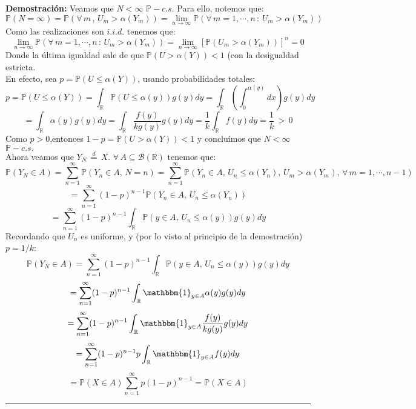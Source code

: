 \documentclass[a4paper]{article}
\numberwithin{equation}{subsection}
\numberwithin{definicion}{subsection}
\def\R{\mathbb R}
\def\to{\rightarrow}
\newcommand{\pb}{\mathbb{P}}
\begin{document}
\textbf{Demostración: }Veamos que $N<\infty$ $\pb-c.s.$ Para ello, notemos que:
\[\pb(N=\infty) = \pb(\forall\,m\,,\,U_m>\alpha(Y_m)) = \lim_{n \to \infty}\pb(\forall\,m=1,\cdots,n\,:\,U_m>\alpha(Y_m))\]
Como las realizaciones son $i.i.d.$ tenemos que:
\[\lim_{n \to \infty}\pb(\forall\,m=1,\cdots,n\,:\,U_m>\alpha(Y_m)) = \lim_{n \to \infty}\left[\pb(U_m > \alpha(Y_m))\right]^{n} = 0\]
Donde la última igualdad sale de que $\pb(U>\alpha(Y)) < 1$ (con la desigualdad estricta.\\ \newline
En efecto, sea $p=\pb(U\leq \alpha(Y))$, usando probabilidades totales:
\[p = \pb(U\leq \alpha(Y)) = \int_{\R}\pb(U\leq \alpha(y))g(y)dy= \int_{\R}\left(\int_{0}^{\alpha(y)}dx\right)g(y)dy\]
\[=\int_{\R}\alpha(y)g(y)dy = \int_{\R}\frac{f(y)}{kg(y)}g(y)dy = \frac{1}{k}\int_{\R}f(y)dy = \frac{1}{k}\,>\,0\]
Como $p>0$,entonces $1-p = \pb(U>\alpha(Y))<1$ y concluímos que $N<\infty$ $\pb-c.s.$\\ \newline
Ahora veamos que $Y_N \,\overset{d}{=}\,X$. $\forall\,A\subseteq \mathcal{B}(\R)$ tenemos que:
\[\pb(Y_N \in A) = \sum_{n=1}^{\infty}\pb(Y_n \in A,\,N=n) = \sum_{n=1}^{\infty}\pb(Y_n \in A,\,U_n\leq\alpha(Y_n),\,U_m>\alpha(Y_m),\,\forall\,m=1,\cdots,n-1)\]
\[=\sum_{n=1}^{\infty}(1-p)^{n-1}\pb(Y_n \in A,\,U_n\leq \alpha(Y_n))\]\[= \sum_{n=1}^{\infty}(1-p)^{n-1} \int_{\R}\pb(y \in A,\,U_n\leq \alpha(y))g(y)dy\]
Recordando que $U_n$ es uniforme, y (por lo visto al principio de la demostración) $p=1/k$:
\[\pb(Y_N \in A)= \sum_{n=1}^{\infty}(1-p)^{n-1} \int_{\R}\pb(y \in A,\,U_n\leq \alpha(y))g(y)dy\]\[= \sum_{n=1}^{\infty}(1-p)^{n-1}\int_{\R}\mathbbm{1}_{y\in A}\alpha(y)g(y) dy\]
\[=\sum_{n=1}^{\infty}(1-p)^{n-1}\int_{\R}\mathbbm{1}_{y\in A}\frac{f(y)}{kg(y)}g(y) dy\] \[= \sum_{n=1}^{\infty}(1-p)^{n-1}p\int_{\R}\mathbbm{1}_{y\in A}f(y) dy\] \[= \pb(X \in A)\sum_{n=1}^{\infty}p(1-p)^{n-1}= \pb(X\in A)\] 
\rule{0.7em}{0.7em}
\end{document}
